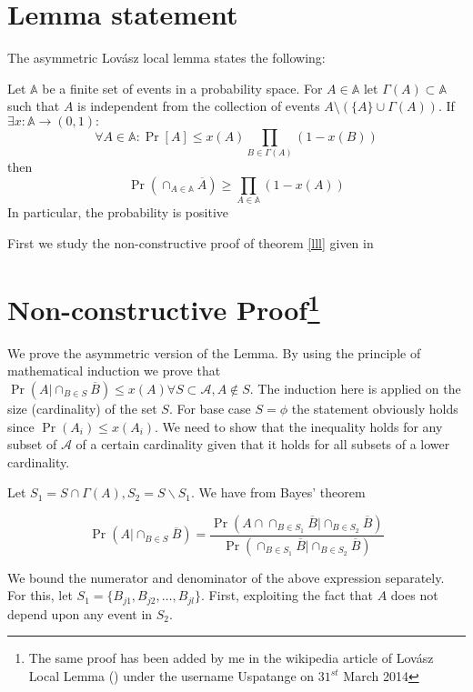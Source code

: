 


\section{Lemma statement}
The asymmetric Lov\'asz local lemma \cite{original} states the following:
\begin{theorem}
\label{lll}
 Let $\mathbb{A}$ be a finite set of events in a probability space. For $A\in \mathbb{A}$ let $\Gamma(A)\subset \mathbb{A} $ such that $A$ is independent from the collection of events $A\setminus (\{A\}\cup\Gamma(A) ) $. If $\exists x:\mathbb{A} \longrightarrow (0,1): $
 \[
    \forall A\in \mathbb{A} : \Pr[A] \leq x(A) \prod\limits_{B\in\Gamma(A) }(1-x(B) )
 \]
 then
 \[
    \Pr(\cap_{A\in\mathbb{A}}\overline{A} ) \geq \prod\limits_{A\in\mathbb{A}}(1-x(A) )
 \]
 In particular, the probability is positive
\end{theorem}
First we study the non-constructive proof of theorem \ref{lll} given in \cite{assym}

\section[Non-constructive Proof]{Non-constructive Proof\footnote{The same proof has been added by me in the wikipedia article of Lov\'asz Local Lemma () under the username Uspatange on $31^{st}$ March 2014 }}
We prove the asymmetric version of the Lemma. By using the principle of mathematical induction we prove that $ \Pr\left(A|\cap_{B \in S}\overline{B}\right)\leq x\left(A\right) \forall S \subset \mathcal{A}, A \not\in S $. The induction here is applied on the size (cardinality) of the set $ S $. For base case $S=\phi$ the statement obviously holds since $ \Pr\left(A_i\right) \leq x\left(A_i\right) $. We need to show that the inequality holds for any subset of $\mathcal{A} $ of a certain cardinality given that it holds for all subsets of a lower cardinality.

Let $S_{1} = S\cap \Gamma(A), S_{2} = {{S \smallsetminus S_{1}}}$. We have from Bayes' theorem

\[
\Pr\left(A|\cap_{B\in S} \overline{B}\right) = \frac{\Pr\left(A\cap\cap_{B\in S_{1}} \overline{B}| \cap_{B\in S_{2}} \overline{B}\right)}{\Pr\left(\cap_{B\in S_{1}}\overline{B}|\cap_{B\in S_{2}} \overline{B} \right)}  \]

We bound the numerator and denominator of the above expression separately. For this, let $ S_{1}=\{B_{j1},B_{j2},\ldots,B_{jl}\} $. First, exploiting the fact that $A$ does not depend upon any event in $ S_{2} $.

